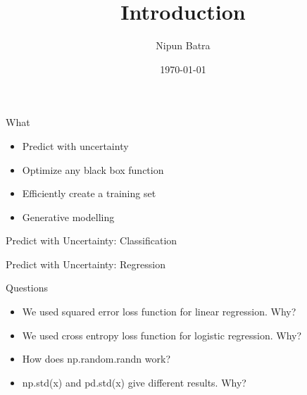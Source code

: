 \documentclass[handout]{beamer}
\begin{document}
\title{Introduction}
\author{Nipun Batra}
\date{\today}
\maketitle

\begin{frame}{What}
    \begin{itemize}
        \item Predict with uncertainty
        \item Optimize any black box function
        \item Efficiently create a training set
        \item Generative modelling
    \end{itemize}

    
\end{frame}

\begin{frame}{Predict with Uncertainty: Classification}
    
\end{frame}

\begin{frame}{Predict with Uncertainty: Regression}
    
\end{frame}


\begin{frame}{Questions}
    \begin{itemize}
        \item We used squared error loss function for linear regression. Why?
        \item We used cross entropy loss function for logistic regression. Why?
        \item How does np.random.randn work?
        \item np.std(x) and pd.std(x) give different results. Why?

    \end{itemize}
    
\end{frame}
\end{document}
